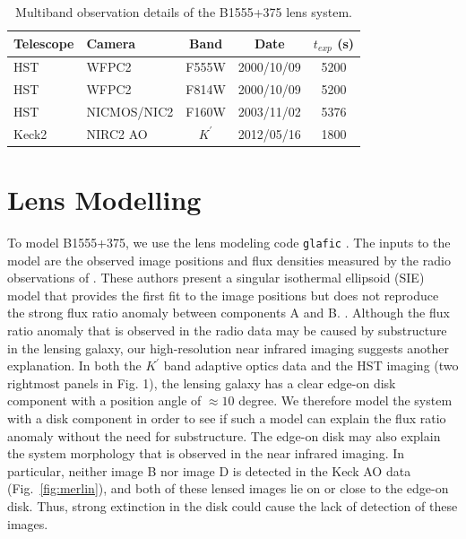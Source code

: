 \documentclass[useAMS,usenatbib]{mn2e}
\begin{document}
\begin{table}
 \centering
  \caption{Multiband observation details of the B1555+375 lens system.}
  \begin{tabular}{@{}llccc}
  
\hline
  Telescope     &      Camera     &  Band & Date &$t_{exp}$ (s) \\

 \hline
   HST				&		WFPC2    &  F555W		&	2000/10/09 	&	5200\\
   HST				&		WFPC2    &  F814W		&	2000/10/09 &	5200\\
   HST				&		NICMOS/NIC2	&	F160W	&	2003/11/02 & 5376\\
   Keck2			&		NIRC2 AO	&   $K^\prime$	& 2012/05/16	&  1800\\
   \hline
\end{tabular}
\end{table}


\section{Lens Modelling}

To model B1555+375, we use the lens modeling code {\tt glafic}
\citep{Oguri}.  The inputs to the model are the observed image
positions and flux densities measured by the radio observations of
\citet{Marlow}.  These authors present a singular isothermal ellipsoid
(SIE) model that provides the first fit to the image positions but
does not reproduce the strong flux ratio anomaly between components A
and B.  \citep[see Fig.~6 and Tables 2 \& 3 in][]{Marlow}.  Although
the flux ratio anomaly that is observed in the radio data may be
caused by substructure in the lensing galaxy, our high-resolution near
infrared imaging suggests another explanation.  In both the $K^\prime$
band adaptive optics data and the HST imaging (two rightmost panels in
Fig. 1), the lensing galaxy has a clear edge-on disk component with a
position angle of $\approx 10$ degree.  We therefore model the system
with a disk component in order to see if such a model can explain the
flux ratio anomaly without the need for substructure.  The edge-on
disk may also explain the system morphology that is observed in the
near infrared imaging.  In particular, neither image B nor image D is
detected in the Keck AO data (Fig.~\ref{fig:merlin}), and both of
these lensed images lie on or close to the edge-on disk.  Thus, strong
extinction in the disk could cause the lack of detection of these
images.
\end{document}
